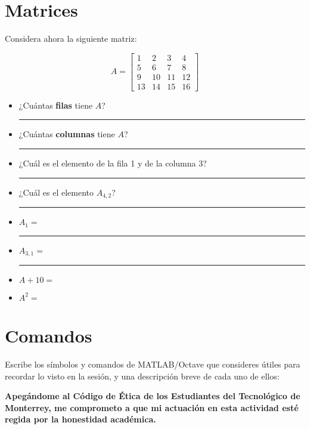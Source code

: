 \documentclass[spanish, 10pt]{article}
\newcommand{\shortresponserule}{{\large\rule{5 cm}{0.3mm}}}
\begin{document}
\section{Matrices}

Considera ahora la siguiente matriz:

$$A = \begin{bmatrix}
    1 & 2 & 3 & 4\\
    5 & 6 & 7 & 8\\
    9 & 10 & 11 & 12\\
    13 & 14 & 15& 16
\end{bmatrix}$$

\begin{itemize}
    \item ¿Cuántas \textbf{filas} tiene $A$? \hfill \shortresponserule
    \item ¿Cuántas \textbf{columnas} tiene $A$? \hfill \shortresponserule
    \item ¿Cuál es el elemento de la fila 1 y de la columna 3? \hfill \shortresponserule
    \item ¿Cuál es el elemento $A_{4,2}$? \hfill \shortresponserule
\end{itemize}

\begin{itemize}
    \item $A_{1} =$ \hfill \shortresponserule
    \item $A_{3,1} =$ \hfill \shortresponserule
    \item $A + 10 =$
    \vspace{20ex}
    \item $A^2 =$
    \vspace{20ex}
\end{itemize}

\section{Comandos}

Escribe los símbolos y comandos de MATLAB/Octave que consideres útiles para recordar lo visto en la sesión, y una descripción breve de cada uno de ellos:

\vfill

\textbf{Apegándome al Código de Ética de los Estudiantes del Tecnológico de Monterrey, me comprometo a que mi actuación en esta actividad esté regida por la honestidad académica.}
\end{document}
